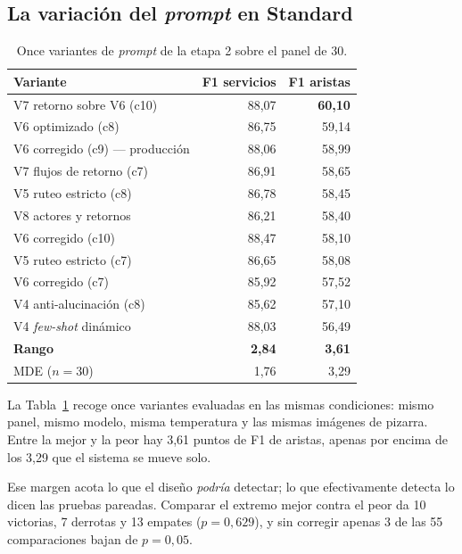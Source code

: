 \documentclass[a4paper, twocolumn, 10pt]{IEEEtran}
\begin{document}
\subsection{La variación del \emph{prompt} en Standard}
\label{sec:rq2}

\begin{table}[H]
\centering\small
\caption{Once variantes de \emph{prompt} de la etapa 2 sobre el panel de 30.}
\label{tab:variantes}
\begin{tabular}{lrr}
\toprule
Variante & F1 servicios & F1 aristas\\
\midrule
V7 retorno sobre V6 (c10)          & 88,07 & \textbf{60,10}\\
V6 optimizado (c8)                 & 86,75 & 59,14\\
V6 corregido (c9) --- producción   & 88,06 & 58,99\\
V7 flujos de retorno (c7)          & 86,91 & 58,65\\
V5 ruteo estricto (c8)             & 86,78 & 58,45\\
V8 actores y retornos              & 86,21 & 58,40\\
V6 corregido (c10)                 & 88,47 & 58,10\\
V5 ruteo estricto (c7)             & 86,65 & 58,08\\
V6 corregido (c7)                  & 85,92 & 57,52\\
V4 anti-alucinación (c8)           & 85,62 & 57,10\\
V4 \emph{few-shot} dinámico        & 88,03 & 56,49\\
\midrule
\textbf{Rango}                     & \textbf{2,84} & \textbf{3,61}\\
MDE ($n=30$)                       & 1,76 & 3,29\\
\bottomrule
\end{tabular}
\end{table}

La Tabla~\ref{tab:variantes} recoge once variantes evaluadas en las
mismas condiciones: mismo panel, mismo modelo, misma temperatura y las
mismas imágenes de pizarra. Entre la mejor y la peor hay 3,61 puntos de
F1 de aristas, apenas por encima de los 3,29 que el sistema se mueve
solo.

Ese margen acota lo que el diseño \emph{podría} detectar; lo que
efectivamente detecta lo dicen las pruebas pareadas. Comparar el extremo
mejor contra el peor da 10 victorias, 7 derrotas y 13 empates
($p=0{,}629$), y sin corregir apenas 3 de las 55 comparaciones bajan de
$p=0{,}05$.
\end{document}
